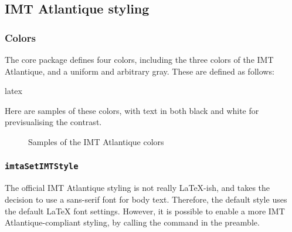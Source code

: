 \documentclass{report}
\begin{document}
\subsection{IMT Atlantique styling}
\subsubsection{Colors}
The core package defines four colors, including the three colors of the IMT Atlantique, and a uniform and arbitrary gray.
These are defined as follows:

\begin{imtaCode}{latex}
\end{imtaCode}

Here are samples of these colors, with text in both black and white for previsualising the contrast.

\begin{figure}[H]
    \centering
    \caption{Samples of the IMT Atlantique colors}
    \label{fig:imtaColors}
\end{figure}


\subsubsection{\texttt{imtaSetIMTStyle}}
The official IMT Atlantique styling is not really \LaTeX-ish, and takes the decision to use a sans-serif font for body text.
Therefore, the default style uses the default \LaTeX{} font settings.
However, it is possible to enable a more IMT Atlantique-compliant styling, by calling the  command in the preamble.
\end{document}
